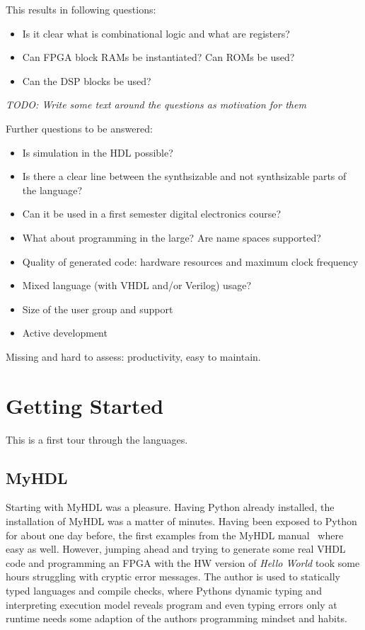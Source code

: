 \documentclass[10pt, conference, compsocconf]{IEEEtran}
\newcommand{\todo}[1]{{\emph{TODO: #1}}}
\begin{document}
This results in following questions:
\begin{itemize}
\item Is it clear what is combinational logic and what are registers?
\item Can FPGA block RAMs be instantiated? Can ROMs be used?
\item Can the DSP blocks be used?
\end{itemize}

\todo{Write some text around the questions as motivation for them}

Further questions to be answered:

\begin{itemize}
\item Is simulation in the HDL possible?
\item Is there a clear line between the synthsizable  and not synthsizable parts of the language?
\item Can it be used in a first semester digital electronics course?
\item What about programming in the large? Are name spaces supported?
\item Quality of generated code: hardware resources and maximum clock frequency
\item Mixed language (with VHDL and/or Verilog) usage?
\item Size of the user group and support
\item Active development
\end{itemize}

Missing and hard to assess: productivity, easy to maintain.

\section{Getting Started}

This is a first tour through the languages.

\subsection{MyHDL}

Starting with MyHDL was a pleasure. Having Python already installed, the installation
of MyHDL was a matter of minutes. Having been exposed to Python for about one
day before, the first examples from the MyHDL manual~\cite{myhdl:2010} where easy as well.
However, jumping ahead and trying to generate some real VHDL code and programming
an FPGA with the HW version of \emph{Hello World} took some hours struggling
with cryptic error messages. The author is used to statically typed languages and
compile checks, where Pythons dynamic typing and interpreting execution model
reveals program and even typing errors only at runtime needs some adaption of
the authors programming mindset and habits.
\end{document}
